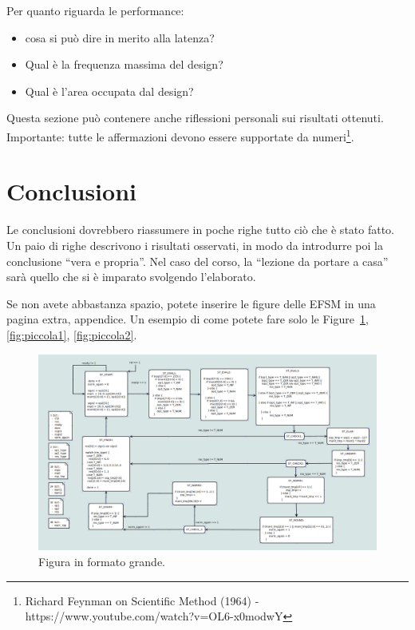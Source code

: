 \documentclass[]{IEEEtran}
\begin{document}
Per quanto riguarda le performance:
\begin{itemize}
\item cosa si pu\`o dire in merito alla latenza?
\item Qual è la frequenza massima del design? 
\item Qual è l'area occupata dal design? 
\end{itemize}

Questa sezione pu\`o contenere anche riflessioni personali sui risultati ottenuti. Importante: tutte le affermazioni devono essere supportate da numeri\footnote{Richard Feynman on Scientific Method (1964) -\\ https://www.youtube.com/watch?v=OL6-x0modwY}.

\section{Conclusioni}
Le conclusioni dovrebbero riassumere in poche righe  tutto ci\`o che \`e stato fatto. Un paio di righe descrivono i risultati osservati, in modo da introdurre poi la conclusione ``vera e propria''. Nel caso del corso, la ``lezione da portare a casa'' sar\`a quello che si \`e imparato svolgendo l'elaborato.





\appendix
Se non avete abbastanza spazio, potete inserire le figure delle EFSM in una  pagina extra, appendice. Un esempio di come potete fare solo le Figure~\ref{fig:grande}, \ref{fig:piccola1}, \ref{fig:piccola2}.


\begin{figure}[bt]
\centering
\includegraphics[width=\textwidth]{figures/EFSM-multiplier}
\caption{Figura in formato grande.}
\label{fig:grande}
\end{figure}
\end{document}
